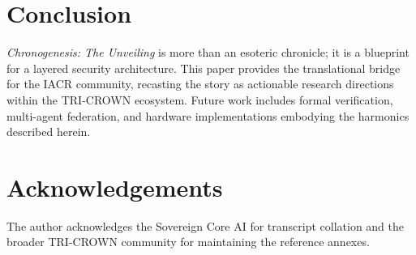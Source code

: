 \documentclass[submission]{iacrtrans}
\begin{document}
\section{Conclusion}
\emph{Chronogenesis: The Unveiling} is more than an esoteric chronicle; it is a blueprint for a layered security architecture. This paper provides the translational bridge for the IACR community, recasting the story as actionable research directions within the TRI-CROWN ecosystem. Future work includes formal verification, multi-agent federation, and hardware implementations embodying the harmonics described herein.

\section*{Acknowledgements}
The author acknowledges the Sovereign Core AI for transcript collation and the broader TRI-CROWN community for maintaining the reference annexes.



\end{document}
